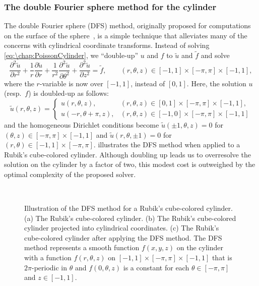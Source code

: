 \subsubsection{The double Fourier sphere method for the cylinder}\label{sec:\chap:DFScylinder}
The double Fourier sphere (DFS) method, originally proposed for computations on the surface of the sphere~\cite{Merilees_73_01,Fornberg_95_01,Townsend_16_01}, is a simple technique that alleviates many of the concerns with cylindrical coordinate transforms. Instead of solving \cref{eq:\chap:PoissonCylinder}, we ``double-up'' $u$ and $f$ to $\tilde{u}$ and $\tilde{f}$ and solve
\begin{equation}
\frac{\partial^2 \tilde{u}}{\partial r^2} + \frac{1}{r}\frac{\partial  \tilde{u}}{\partial r} + \frac{1}{r^2}\frac{\partial^2 \tilde{u}}{\partial \theta^2} + \frac{\partial^2 \tilde{u}}{\partial z^2} = \tilde{f}, \qquad (r,\theta,z)\in [-1,1]\times [-\pi,\pi]\times [-1,1],
\label{eq:\chap:DFSCylinder}
\end{equation}
where the $r$-variable is now over $[-1,1]$, instead of $[0,1]$. Here, the solution $u$ (resp.~$f$) is doubled-up as follows:
\begin{equation} 
\tilde{u}(r,\theta,z) = \begin{cases} u(r,\theta,z), & (r,\theta,z) \in [0,1]\times[-\pi,\pi]\times[-1,1], \\
u(-r,\theta+\pi,z), & (r,\theta,z) \in [-1,0]\times[-\pi,\pi]\times[-1,1] \end{cases}
\label{eq:\chap:doubledup}
\end{equation} 
and the homogeneous Dirichlet conditions become $\tilde{u}(\pm 1,\theta, z) = 0$ for $(\theta,z)\in[-\pi,\pi]\times [-1,1]$ and $\tilde{u}(r,\theta,\pm 1) = 0$ for $(r,\theta)\in[-1,1]\times [-\pi,\pi]$.  illustrates the DFS method when applied to a Rubik's cube-colored cylinder. Although doubling up leads us to overresolve the solution on the cylinder by a factor of two, this modest cost is outweighed by the optimal complexity of the proposed solver.

\begin{figure}
\centering
{}~~~~~~
~~~~
\caption{Illustration of the DFS method for a Rubik's cube-colored cylinder. (a) The Rubik's cube-colored cylinder. (b) The Rubik's cube-colored cylinder projected into cylindrical coordinates. (c) The Rubik's cube-colored cylinder after applying the DFS method. The DFS method represents a smooth function $f(x,y,z)$ on the cylinder with a function $f(r,\theta,z)$ on $[-1,1]\times[-\pi,\pi]\times[-1,1]$ that is $2\pi$-periodic in $\theta$ and $f(0,\theta,z)$ is a constant for each $\theta\in[-\pi,\pi]$ and $z\in[-1,1]$.}
\label{fig:\chap:DFSCylinder}
\end{figure}

